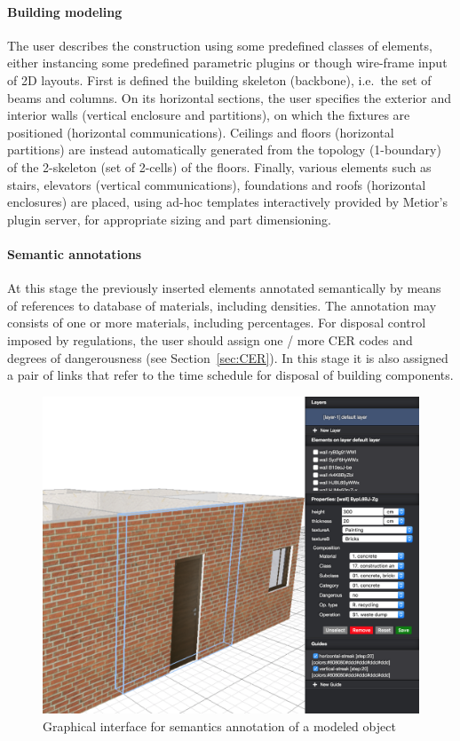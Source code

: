 \paragraph{Building modeling} 

The user describes the construction using some predefined classes of elements, either instancing some  predefined parametric plugins or though wire-frame input of 2D layouts. 
First is defined the building skeleton (backbone), i.e.~the set of beams and columns.
On its horizontal sections, the user specifies the exterior and interior walls (vertical enclosure and partitions), on which the fixtures are positioned (horizontal communications).
Ceilings and floors (horizontal partitions) are instead automatically generated from the topology (1-boundary) of the 2-skeleton (set of 2-cells) of the floors.
Finally, various elements such as stairs, elevators (vertical communications), foundations and roofs (horizontal enclosures) are placed, using ad-hoc templates interactively provided by Metior's plugin server, for appropriate sizing and part dimensioning.

\paragraph{Semantic annotations} 

At this stage the previously inserted elements annotated semantically  by means of references to database of materials, including densities. The annotation may consists of one or more materials, including percentages.
For disposal control imposed by regulations, the user should assign one / more CER codes and degrees of dangerousness (see Section~\ref{sec:CER}).
In this stage it is also assigned a pair of links that refer to the time schedule for disposal of  building components.

\begin{figure}[!h]
  \centering
  \includegraphics[width=1\linewidth]{images/3d-sel}
  \caption{Graphical interface for semantics annotation of a modeled object}
  \label{fig:semantics}
\end{figure}


